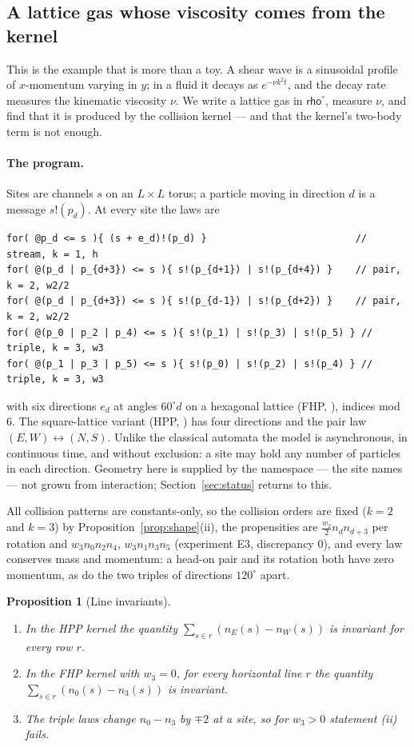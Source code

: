 \documentclass[11pt,a4paper]{article}
\theoremstyle{plain}
\newtheorem{proposition}[theorem]{Proposition}
\theoremstyle{definition}
\theoremstyle{remark}
\newcommand{\krho}{\textsf{rho}^{\circ}}
\begin{document}
\subsection{A lattice gas whose viscosity comes from the kernel}\label{ssec:lattice}

This is the example that is more than a toy. A shear wave is a sinusoidal
profile of $x$-momentum varying in $y$; in a fluid it decays as
$e^{-\nu k^2t}$, and the decay rate measures the kinematic viscosity $\nu$. We
write a lattice gas in $\krho$, measure $\nu$, and find that it is produced by
the collision kernel --- and that the kernel's two-body term is not enough.

\paragraph{The program.}
Sites are channels $s$ on an $L\times L$ torus; a particle moving in direction
$d$ is a message $s!(p_d)$. At every site the laws are
\begin{lstlisting}
for( @p_d <= s ){ (s + e_d)!(p_d) }                          // stream, k = 1, h
for( @(p_d | p_{d+3}) <= s ){ s!(p_{d+1}) | s!(p_{d+4}) }    // pair,  k = 2, w2/2
for( @(p_d | p_{d+3}) <= s ){ s!(p_{d-1}) | s!(p_{d+2}) }    // pair,  k = 2, w2/2
for( @(p_0 | p_2 | p_4) <= s ){ s!(p_1) | s!(p_3) | s!(p_5) } // triple, k = 3, w3
for( @(p_1 | p_3 | p_5) <= s ){ s!(p_0) | s!(p_2) | s!(p_4) } // triple, k = 3, w3
\end{lstlisting}
with six directions $e_d$ at angles $60^\circ d$ on a hexagonal lattice (FHP,
\cite{FHP}), indices mod $6$. The square-lattice variant (HPP, \cite{HPP}) has
four directions and the pair law $(E,W)\leftrightarrow(N,S)$. Unlike the
classical automata the model is asynchronous, in continuous time, and without
exclusion: a site may hold any number of particles in each direction. Geometry
here is supplied by the namespace --- the site names --- not grown from
interaction; Section~\ref{sec:status} returns to this.

All collision patterns are constants-only, so the collision orders are fixed
($k=2$ and $k=3$) by Proposition~\ref{prop:shape}(ii), the propensities are
$\tfrac{w_2}{2}n_dn_{d+3}$ per rotation and $w_3n_0n_2n_4$, $w_3n_1n_3n_5$
(experiment E3, discrepancy $0$), and every law conserves mass and momentum:
a head-on pair and its rotation both have zero momentum, as do the two triples
of directions $120^\circ$ apart.

\begin{proposition}[Line invariants]\label{prop:lines}
\begin{enumerate}[label=(\roman*)]
\item In the HPP kernel the quantity $\sum_{s\in r}(n_E(s)-n_W(s))$ is
invariant for every row $r$.
\item In the FHP kernel with $w_3=0$, for every horizontal line $r$ the quantity
$\sum_{s\in r}(n_0(s)-n_3(s))$ is invariant.
\item The triple laws change $n_0-n_3$ by $\mp2$ at a site, so for $w_3>0$
statement (ii) fails.
\end{enumerate}
\end{proposition}
\end{document}
